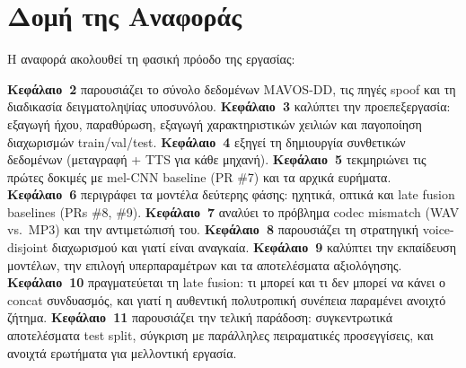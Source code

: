 \section{Δομή της Αναφοράς}

Η αναφορά ακολουθεί τη φασική πρόοδο της εργασίας:

\textbf{Κεφάλαιο~2} παρουσιάζει το σύνολο δεδομένων MAVOS-DD,
τις πηγές spoof και τη διαδικασία δειγματοληψίας υποσυνόλου.
\textbf{Κεφάλαιο~3} καλύπτει την προεπεξεργασία:
εξαγωγή ήχου, παραθύρωση, εξαγωγή χαρακτηριστικών χειλιών
και παγοποίηση διαχωρισμών train/val/test.
\textbf{Κεφάλαιο~4} εξηγεί τη δημιουργία συνθετικών δεδομένων
(μεταγραφή + TTS για κάθε μηχανή).
\textbf{Κεφάλαιο~5} τεκμηριώνει τις πρώτες δοκιμές
με mel-CNN baseline (PR \#7) και τα αρχικά ευρήματα.
\textbf{Κεφάλαιο~6} περιγράφει τα μοντέλα δεύτερης φάσης:
ηχητικά, οπτικά και late fusion baselines (PRs \#8, \#9).
\textbf{Κεφάλαιο~7} αναλύει το πρόβλημα codec mismatch
(WAV vs.\ MP3) και την αντιμετώπισή του.
\textbf{Κεφάλαιο~8} παρουσιάζει τη στρατηγική voice-disjoint
διαχωρισμού και γιατί είναι αναγκαία.
\textbf{Κεφάλαιο~9} καλύπτει την εκπαίδευση μοντέλων,
την επιλογή υπερπαραμέτρων και τα αποτελέσματα αξιολόγησης.
\textbf{Κεφάλαιο~10} πραγματεύεται τη late fusion:
τι μπορεί και τι δεν μπορεί να κάνει ο concat συνδυασμός,
και γιατί η αυθεντική πολυτροπική συνέπεια παραμένει ανοιχτό ζήτημα.
\textbf{Κεφάλαιο~11} παρουσιάζει την τελική παράδοση:
συγκεντρωτικά αποτελέσματα test split, σύγκριση με παράλληλες
πειραματικές προσεγγίσεις, και ανοιχτά ερωτήματα για μελλοντική εργασία.

